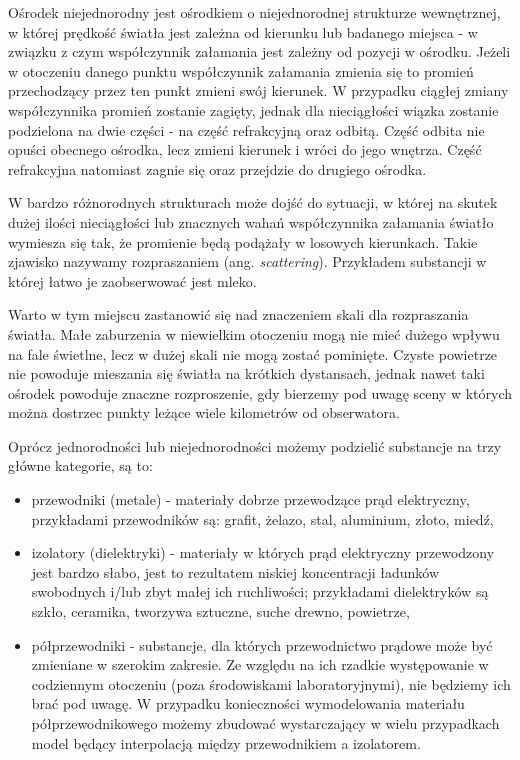 \documentclass[../main.tex]{subfiles}
\begin{document}
Ośrodek niejednorodny jest ośrodkiem o niejednorodnej strukturze wewnętrznej, w której prędkość światła jest zależna od kierunku lub badanego miejsca - w związku z czym współczynnik załamania jest zależny od pozycji w ośrodku. Jeżeli w otoczeniu danego punktu współczynnik załamania zmienia się to promień przechodzący przez ten punkt zmieni swój kierunek. W przypadku ciągłej zmiany współczynnika promień zostanie zagięty, jednak dla nieciągłości wiązka zostanie podzielona na dwie części - na część refrakcyjną oraz odbitą. Część odbita nie opuści obecnego ośrodka, lecz zmieni kierunek i wróci do jego wnętrza. Część refrakcyjna natomiast zagnie się oraz przejdzie do drugiego ośrodka. 

W bardzo różnorodnych strukturach może dojść do sytuacji, w której na skutek dużej ilości nieciągłości lub znacznych wahań współczynnika załamania światło wymiesza się tak, że promienie będą podążały w losowych kierunkach. Takie zjawisko nazywamy rozpraszaniem (ang. \textit{scattering}). Przykładem substancji w której łatwo je zaobserwować jest mleko.

Warto w tym miejscu zastanowić się nad znaczeniem skali dla rozpraszania światła. Małe zaburzenia w niewielkim otoczeniu mogą nie mieć dużego wpływu na fale świetlne, lecz w dużej skali nie mogą zostać pominięte. Czyste powietrze nie powoduje mieszania się światła na krótkich dystansach, jednak nawet taki ośrodek powoduje znaczne rozproszenie, gdy bierzemy pod uwagę sceny w których można dostrzec punkty leżące wiele kilometrów od obserwatora. 

Oprócz jednorodności lub niejednorodności możemy podzielić substancje na trzy główne kategorie, są to:

\begin{itemize}
	\item przewodniki (metale) - materiały dobrze przewodzące prąd elektryczny, przykładami przewodników są: grafit, żelazo, stal, aluminium, złoto, miedź,
    
	\item izolatory (dielektryki) - materiały w których prąd elektryczny przewodzony jest bardzo słabo, jest to rezultatem niskiej koncentracji ładunków swobodnych i/lub zbyt małej ich ruchliwości; przykładami dielektryków są szkło, ceramika, tworzywa sztuczne, suche drewno, powietrze,
	
	\item półprzewodniki - substancje, dla których przewodnictwo prądowe może być zmieniane w szerokim zakresie. Ze względu na ich rzadkie występowanie w codziennym otoczeniu (poza środowiskami laboratoryjnymi), nie będziemy ich brać pod uwagę. W przypadku konieczności wymodelowania materiału półprzewodnikowego możemy zbudować wystarczający w wielu przypadkach model będący interpolacją między przewodnikiem a izolatorem.
\end{itemize}
\end{document}
